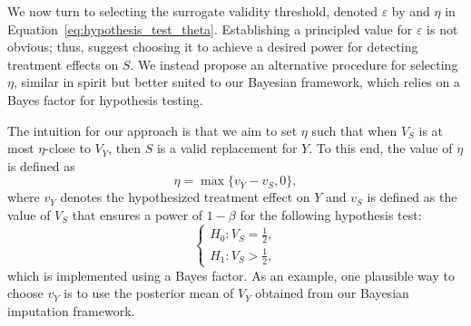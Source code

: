 \documentclass[referee,usenatbib]{biom}
\begin{document}
We now turn to selecting the surrogate validity threshold, denoted \(\varepsilon\) by \citet{parast2024rank} and \(\eta\) in Equation~\eqref{eq:hypothesis_test_theta}. Establishing a principled value for \(\varepsilon\) is not obvious; thus, \citet{parast2024rank} suggest choosing it to achieve a desired power for detecting treatment effects on \(S\). We instead propose an alternative procedure for selecting \(\eta\), similar in spirit but better suited to our Bayesian framework, which relies on a Bayes factor for hypothesis testing.

The intuition for our approach is that we aim to set \(\eta\) such that when \(V_{S}\) is at most \(\eta\)-close to \(V_{Y}\), then \(S\) is a valid replacement for \(Y\). To this end, the value of \(\eta\) is defined as
\begin{equation*}
    \eta = \max \{ v_{Y} - v_{S}, 0 \},
\end{equation*}
where \(v_Y\) denotes the hypothesized treatment effect on \(Y\) and \(v_S\) is defined as the value of \(V_{S}\) that ensures a power of \(1 - \beta\) for the following hypothesis test:
\begin{equation}
    \label{eq:hypothesis_test_V_S}
    \begin{cases}
        H_{0}: V_{S} = \tfrac{1}{2}, \\
        H_{1}: V_{S} > \tfrac{1}{2},
    \end{cases}
\end{equation}
which is implemented using a Bayes factor. As an example, one plausible way to choose \(v_Y\) is to use the posterior mean of \(V_{Y}\) obtained from our Bayesian imputation framework. %
\end{document}
